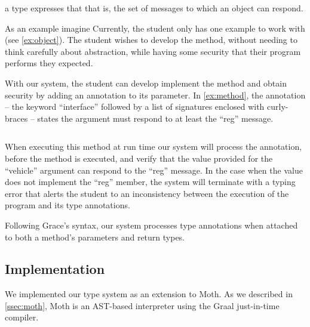  a type expresses that 
that is, the set of messages to which an object can respond.

As an example imagine  
Currently, the student only has one example to work with (see \cref{ex:object}).
The student wishes to develop the method,
without needing to think carefully about abstraction,
while having some security that their program
performs they expected.



With our system, the student can develop implement the method and 
obtain security by adding an annotation to its parameter. 
In \cref{ex:method}, the annotation
-- the keyword ``interface'' followed by a list of signatures enclosed with curly-braces --
states the argument must respond to at least the ``reg'' message. 

\begin{lstlisting}[label={ex:method},caption={A method with its argument annotated with an interface literal, stating that the value must respond to at least the ``reg'' message.}]

\end{lstlisting}

When executing this method at run time
our system will process the annotation,
before the method is executed,
and verify that the value provided for the ``vehicle'' argument 
can respond to the ``reg'' message.
In the case when the value does not implement the ``reg'' member,
the system will terminate with a typing error 
that alerts the student to an inconsistency between the
execution of the program and its type annotations.



Following Grace's syntax, our system processes type annotations when attached
to both a method's parameters and return types. 

\subsection{Implementation} 
\label{ssec:implementation} 


We implemented our type system as an extension to Moth.
As we described in \cref{ssec:moth},
Moth is an AST-based interpreter
using the Graal just-in-time compiler\citep{Wurthinger:2017:PPE}.


